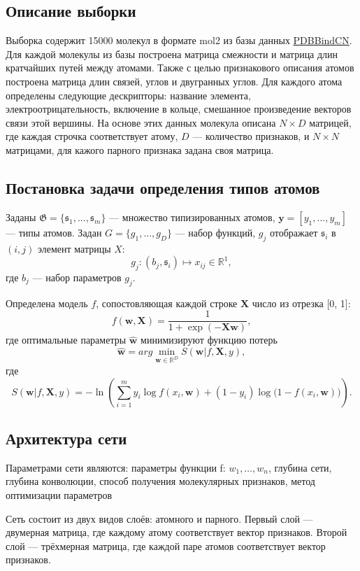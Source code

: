 \documentclass[12pt,twoside]{article}
\begin{document}
\subsection{Описание выборки}
Выборка содержит 15000 молекул в формате mol2 из базы данных \href{http://www.pdbbind.org.cn/}{PDBBindCN}. Для каждой молекулы из базы построена матрица смежности и матрица длин кратчайших путей между атомами. Также с целью признакового описания атомов построена матрица длин связей, углов и двугранных углов. Для каждого атома определены следующие дескрипторы: название элемента, электроотрицательность, включение в кольце, смешанное произведение векторов связи этой вершины. На основе этих данных молекула описана $N\times D$ матрицей, где каждая строчка соответствует атому, $D$ --- количество признаков, и $N\times N$ матрицами, для кажого парного признака задана своя матрица.

\subsection{Постановка задачи определения типов атомов}
	Заданы  $\mathfrak{G} = \{\mathfrak{s}_1,...,\mathfrak{s}_m\}$ --- множество типизированных атомов, $\mathbf{y} = [y_1,...,y_m]$ --- типы атомов. Задан $G = \{g_1,...,g_{D}\}$ --- набор функций, $g_j$ отображает $\mathfrak{s}_i$ в $(i, j)$ элемент матрицы $X$: $$g_j: (b_j, \mathfrak{s}_i)\mapsto x_{ij} \in \mathbb{R}^1,$$ где $b_j$ --- набор параметров $g_j$.
	
	Определена модель $f$, сопостовляющая каждой строке $\mathbf{X}$ число из отрезка [0, 1]: $$f(\mathbf{w}, \mathbf{X}) = \frac{1}{1+\exp(-\mathbf{Xw})},$$ где оптимальные параметры $\hat{\mathbf{w}}$ минимизируют функцию потерь $$\hat{\mathbf{w}}=arg\min\limits_{\mathbf{w} \in \mathbb{R}^{D}} S(\mathbf{w}|f, \mathbf{X}, y),$$ где $$S(\mathbf{w}|f, \mathbf{X}, y)=-\ln\left(\sum_{i=1}^m {y_i \log f(x_i, \mathbf{w}) + (1-y_i)\log\bigl(1-f(x_i, \mathbf{w})\bigr)}\right).$$

\subsection{Архитектура сети}
	Параметрами сети являются: параметры функции f: $w_1,\dots,w_n$, глубина сети, глубина конволюции, способ получения молекулярных признаков, метод оптимизации параметров
	
	Сеть состоит из двух видов слоёв: атомного и парного. Первый слой --- двумерная матрица, где каждому атому соответствует вектор признаков. Второй слой --- трёхмерная матрица, где каждой паре атомов соответствует вектор признаков.
	
\end{document}
